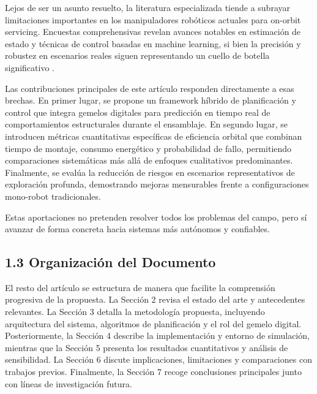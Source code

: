 Lejos de ser un asunto resuelto, la literatura especializada tiende a subrayar limitaciones importantes en los manipuladores robóticos actuales para on-orbit servicing. Encuestas comprehensivas revelan avances notables en estimación de estado y técnicas de control basadas en machine learning, si bien la precisión y robustez en escenarios reales siguen representando un cuello de botella significativo \cite{Alizadeh2024_Survey}.

Las contribuciones principales de este artículo responden directamente a esas brechas. En primer lugar, se propone un framework híbrido de planificación y control que integra gemelos digitales para predicción en tiempo real de comportamientos estructurales durante el ensamblaje. En segundo lugar, se introducen métricas cuantitativas específicas de eficiencia orbital que combinan tiempo de montaje, consumo energético y probabilidad de fallo, permitiendo comparaciones sistemáticas más allá de enfoques cualitativos predominantes. Finalmente, se evalúa la reducción de riesgos en escenarios representativos de exploración profunda, demostrando mejoras mensurables frente a configuraciones mono-robot tradicionales.

Estas aportaciones no pretenden resolver todos los problemas del campo, pero sí avanzar de forma concreta hacia sistemas más autónomos y confiables.

\subsection{1.3 Organización del Documento}

El resto del artículo se estructura de manera que facilite la comprensión progresiva de la propuesta. La Sección 2 revisa el estado del arte y antecedentes relevantes. La Sección 3 detalla la metodología propuesta, incluyendo arquitectura del sistema, algoritmos de planificación y el rol del gemelo digital. Posteriormente, la Sección 4 describe la implementación y entorno de simulación, mientras que la Sección 5 presenta los resultados cuantitativos y análisis de sensibilidad. La Sección 6 discute implicaciones, limitaciones y comparaciones con trabajos previos. Finalmente, la Sección 7 recoge conclusiones principales junto con líneas de investigación futura.


